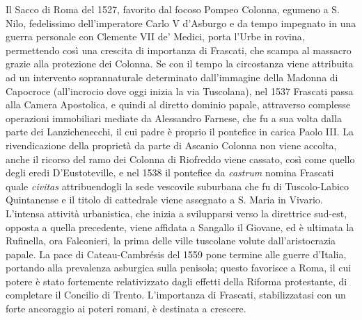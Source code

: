 \documentclass[
  letterpaper,
  DIV=11,
  numbers=noendperiod]{scrartcl}
\begin{document}
Il Sacco di Roma del 1527, favorito dal focoso Pompeo Colonna, egumeno a
S. Nilo, fedelissimo dell'imperatore Carlo V d'Asburgo e da tempo
impegnato in una guerra personale con Clemente VII de' Medici, porta
l'Urbe in rovina, permettendo così una crescita di importanza di
Frascati, che scampa al massacro grazie alla protezione dei Colonna. Se
con il tempo la circostanza viene attribuita ad un intervento
soprannaturale determinato dall'immagine della Madonna di Capocroce
(all'incrocio dove oggi inizia la via Tuscolana), nel 1537 Frascati
passa alla Camera Apostolica, e quindi al diretto dominio papale,
attraverso complesse operazioni immobiliari mediate da Alessandro
Farnese, che fu a sua volta dalla parte dei Lanzichenecchi, il cui padre
è proprio il pontefice in carica Paolo III. La rivendicazione della
proprietà da parte di Ascanio Colonna non viene accolta, anche il
ricorso del ramo dei Colonna di Riofreddo viene cassato, così come
quello degli eredi D'Eustoteville, e nel 1538 il pontefice da
\emph{castrum} nomina Frascati quale \emph{civitas} attribuendogli la
sede vescovile suburbana che fu di Tuscolo-Labico Quintanense e il
titolo di cattedrale viene assegnato a S. Maria in Vivario. L'intensa
attività urbanistica, che inizia a svilupparsi verso la direttrice
sud-est, opposta a quella precedente, viene affidata a Sangallo il
Giovane, ed è ultimata la Rufinella, ora Falconieri, la prima delle
ville tuscolane volute dall'aristocrazia papale. La pace di
Cateau-Cambrésis del 1559 pone termine alle guerre d'Italia, portando
alla prevalenza asburgica sulla penisola; questo favorisce a Roma, il
cui potere è stato fortemente relativizzato dagli effetti della Riforma
protestante, di completare il Concilio di Trento. L'importanza di
Frascati, stabilizzatasi con un forte ancoraggio ai poteri romani, è
destinata a crescere.
\end{document}
